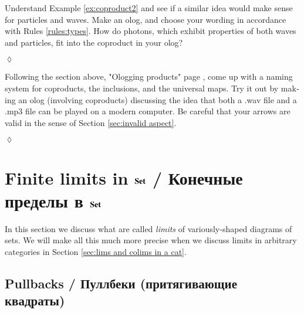 \documentclass{book}
\def\Set{{\bf Set}}
\theoremstyle{theoremENG}
\theoremstyle{lemmaENG}
\theoremstyle{propositionENG}
\theoremstyle{corollaryENG}
\theoremstyle{factENG}
\theoremstyle{remarkENG}
\theoremstyle{exampleENG}
\newtheorem{exampleENG}[subsubsection]{\begin{english}Example\end{english}}
\theoremstyle{warningENG}
\theoremstyle{questionENG}
\theoremstyle{guessENG}
\theoremstyle{answerENG}
\theoremstyle{constructionENG}
\theoremstyle{rulesENG}
\theoremstyle{excENG}
\newtheorem{excENG}[subsubsection]{\begin{english}Exercise\end{english}}
\theoremstyle{appENG}
\theoremstyle{definitionENG}
\theoremstyle{notationENG}
\theoremstyle{conjectureENG}
\theoremstyle{postulateENG}
\newenvironment{exerciseENG}{\begin{excENG}}{\hspace*{\fill}$\lozenge$\end{excENG}}
\theoremstyle{theoremRUS}
\theoremstyle{lemmaRUS}
\theoremstyle{propositionRUS}
\theoremstyle{corollaryRUS}
\theoremstyle{factRUS}
\theoremstyle{remarkRUS}
\theoremstyle{exampleRUS}
\theoremstyle{warningRUS}
\theoremstyle{questionRUS}
\theoremstyle{guessRUS}
\theoremstyle{answerRUS}
\theoremstyle{constructionRUS}
\theoremstyle{rulesRUS}
\theoremstyle{excRUS}
\theoremstyle{appRUS}
\theoremstyle{definitionRUS}
\theoremstyle{notationRUS}
\theoremstyle{conjectureRUS}
\theoremstyle{postulateRUS}
\begin{document}
\begin{english}
\begin{exampleENG}
\begin{russian} \end{russian}

\end{exampleENG}

\begin{exerciseENG}

Understand Example \ref{ex:coproduct2} and see if a similar idea would make sense for particles and waves. Make an olog, and choose your wording in accordance with Rules \ref{rules:types}. How do photons, which exhibit properties of both waves and particles, fit into the coproduct in your olog?

\begin{russian} \end{russian}

\end{exerciseENG}

\begin{exerciseENG}

Following the section above, "Ologging products" page \pageref{sec:ologging products}, come up with a naming system for coproducts, the inclusions, and the universal maps. Try it out by making an olog (involving coproducts) discussing the idea that both a .wav file and a .mp3 file can be played on a modern computer. Be careful that your arrows are valid in the sense of Section \ref{sec:invalid aspect}.

\begin{russian} \end{russian}

\end{exerciseENG}


\section{Finite limits in $\Set$ / Конечные пределы в $\Set$}\label{sec:finite limits}

In this section we discuss what are called {\em limits} of variously-shaped diagrams of sets. We will make all this much more precise when we discuss limits in arbitrary categories in Section \ref{sec:lims and colims in a cat}.

\begin{russian} \end{russian}


\subsection{Pullbacks / Пуллбеки (притягивающие квадраты)}


\end{english}
\end{document}
